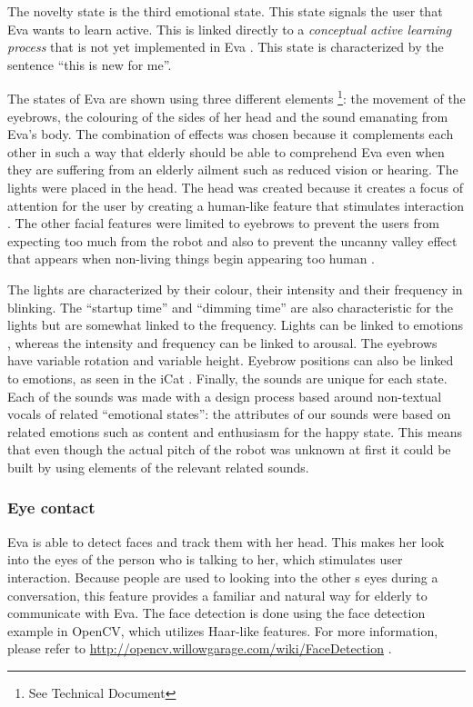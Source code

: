 \documentclass[project_eva.tex]{subfiles}
\begin{document}
The novelty state is the third emotional state. This state signals the user that Eva wants to learn active. This is linked 
directly to a \textit{conceptual active learning process} that is not yet implemented in Eva \pageref{sec:Concept}. This state is characterized by the sentence ``this is new for me''.

The states of Eva are shown using three different elements \footnote{See Technical Document}: the movement of the eyebrows, the colouring of the sides of her head  and the sound emanating from Eva’s body. The combination of effects was chosen because it complements each other in such a way that elderly should be able to comprehend Eva even when they are suffering from an elderly ailment such as reduced vision or hearing. The lights were placed in the head. The head was created because it creates a focus of attention for the user by creating a human-like feature that stimulates interaction \cite{elderly}. The other facial features were limited to eyebrows to prevent the users from expecting too much from the robot and also to prevent the uncanny valley effect that appears when non-living things begin appearing too human \cite{uncanny}. 

The lights are characterized by their colour, their intensity and their frequency in blinking. The ``startup time'' and 
``dimming time'' are also characteristic for the lights but are somewhat linked to the frequency. Lights can be linked to 
emotions \cite{colour-emotion} , whereas the intensity and frequency can be linked to arousal. The eyebrows have variable rotation and variable height. Eyebrow positions can also be linked to emotions, as seen in the iCat \cite{iCat}. Finally, the sounds are unique for each state. Each of the sounds was made with a design process based around non-textual vocals of related ``emotional states'': the attributes of our sounds were based on related emotions  such as content and enthusiasm for the happy state. This means that even though the actual pitch of the robot was unknown at first it could be built by using elements \cite{sounds} of the relevant related sounds.

\subsubsection*{Eye contact}
Eva is able to detect faces and track them with her head. This makes her look into the eyes of the person who is talking to 
her, which stimulates user interaction. Because people are used to looking into the other\textquotesingle
s eyes during a conversation, 
this feature provides a familiar and natural way for elderly to communicate with Eva. The face detection is done using the 
face detection example in OpenCV, which utilizes Haar-like features. For more information, please refer to 
\url{http://opencv.willowgarage.com/wiki/FaceDetection} \cite{FaceDetection} .
\end{document}
